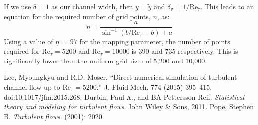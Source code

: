 \documentclass[a4paper,11pt]{article}
\begin{document}
If we use $\delta = 1$ as our channel width, then $y = \tilde{y}$ and $\delta_v = 1/\mathrm{Re}_{\tau}$.  This leads to an equation for the required number of grid points, $n$, as:
\begin{equation}
 n = \frac{a}{\sin^{-1}(b/\mathrm{Re}_{\tau}-b)+a}
\end{equation}
Using a value of $\eta = .97$ for the mapping parameter, the number of points required for $\mathrm{Re}_{\tau}=5200$ and $\mathrm{Re}_{\tau}=10000$ is 390 and 735 respectively. This is significantly lower than the uniform grid sizes of 5,200 and 10,000.





\clearpage
\begin{thebibliography}{3}
Lee, Myoungkyu and R.D. Moser, ``Direct numerical simulation of turbulent channel flow up to $\mathrm{Re}_{\tau}=5200$,'' J. Fluid Mech. 774 (2015) 395–415. doi:10.1017/jfm.2015.268.
    Durbin, Paul A., and BA Pettersson Reif. \textit{Statistical theory and
modeling for turbulent flows}. John Wiley \& Sons, 2011.
        Pope, Stephen B. \textit{Turbulent flows}. (2001): 2020.
 
\newpage



\end{thebibliography}
\end{document}
